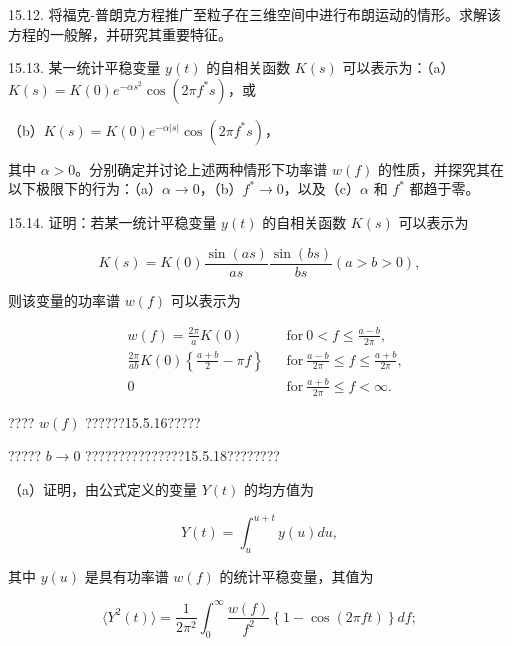 15.12. 将福克-普朗克方程推广至粒子在三维空间中进行布朗运动的情形。求解该方程的一般解，并研究其重要特征。

15.13. 某一统计平稳变量 \(y(t)\) 的自相关函数 \(K(s)\) 可以表示为：（a）\(K(s) = K(0)e^{-\alpha s^2}\cos(2\pi f^*s)\)，或

（b）\(K(s) = K(0)e^{-\alpha|s|}\cos(2\pi f^*s)\)，

其中 \(\alpha > 0\)。分别确定并讨论上述两种情形下功率谱 \(w(f)\) 的性质，并探究其在以下极限下的行为：（a）\(\alpha \to 0\)，（b）\(f^* \to 0\)，以及（c）\(\alpha\) 和 \(f^*\) 都趋于零。

15.14. 证明：若某一统计平稳变量 \(y(t)\) 的自相关函数 \(K(s)\) 可以表示为

\begin{equation}\tag{15.6.73}\label{eq:15.6.73}
K ( s ) = K ( 0 ) \frac { \sin ( a s ) } { a s } \frac { \sin ( b s ) } { b s }  ( a > b > 0 ) ,
\end{equation}

则该变量的功率谱 \(w(f)\) 可以表示为

\begin{equation}\tag{15.6.74}\label{eq:15.6.74}
\begin{array}{rlrl} & { w ( f ) = \frac { 2 \pi } { a } K ( 0 ) } & & { \mathrm { f o r ~ } 0 < f \leq \frac { a - b } { 2 \pi } , } \\& { \frac { 2 \pi } { a b } K ( 0 ) \left\{ \frac { a + b } { 2 } - \pi f \right\} } & & { \mathrm { f o r ~ } \frac { a - b } { 2 \pi } \leq f \leq \frac { a + b } { 2 \pi } , } \\& { 0 } & & { \mathrm { f o r ~ } \frac { a + b } { 2 \pi } \leq f < \infty . } \end{array}
\end{equation}

???? \(w(f)\) ??????15.5.16?????

????? \(b \to 0\) ???????????????15.5.18????????

（a）证明，由公式定义的变量 \(Y(t)\) 的均方值为

\begin{equation}\tag{15.6.75}\label{eq:15.6.75}
Y ( t ) = \int _ { u } ^{u + t} y ( u ) d u ,
\end{equation}

其中 \(y(u)\) 是具有功率谱 \(w(f)\) 的统计平稳变量，其值为

\begin{equation}\tag{15.6.76}\label{eq:15.6.76}
\langle Y ^{2} ( t ) \rangle = \frac { 1 } { 2 \pi ^{2} } \int _ { 0 } ^{\infty} \frac { w ( f ) } { f ^{2} } \left\{ 1 - \cos ( 2 \pi f t ) \right\} d f ;
\end{equation}

